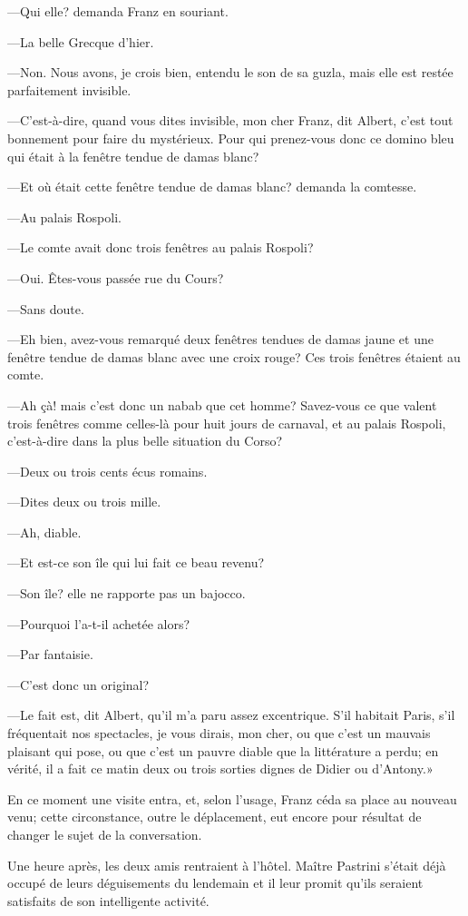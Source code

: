 —Qui elle? demanda Franz en souriant. 

—La belle Grecque d'hier. 

—Non. Nous avons, je crois bien, entendu le son de sa guzla, mais elle est restée parfaitement invisible.  

—C'est-à-dire, quand vous dites invisible, mon cher Franz, dit Albert, c'est tout bonnement pour faire du mystérieux. Pour qui prenez-vous donc ce domino bleu qui était à la fenêtre tendue de damas blanc? 

—Et où était cette fenêtre tendue de damas blanc? demanda la comtesse. 

—Au palais Rospoli. 

—Le comte avait donc trois fenêtres au palais Rospoli? 

—Oui. Êtes-vous passée rue du Cours? 

—Sans doute. 

—Eh bien, avez-vous remarqué deux fenêtres tendues de damas jaune et une fenêtre tendue de damas blanc avec une croix rouge? Ces trois fenêtres étaient au comte. 

—Ah çà! mais c'est donc un nabab que cet homme? Savez-vous ce que valent trois fenêtres comme celles-là pour huit jours de carnaval, et au palais Rospoli, c'est-à-dire dans la plus belle situation du Corso? 

—Deux ou trois cents écus romains. 

—Dites deux ou trois mille.  

—Ah, diable. 

—Et est-ce son île qui lui fait ce beau revenu? 

—Son île? elle ne rapporte pas un bajocco. 

—Pourquoi l'a-t-il achetée alors? 

—Par fantaisie. 

—C'est donc un original? 

—Le fait est, dit Albert, qu'il m'a paru assez excentrique. S'il habitait Paris, s'il fréquentait nos spectacles, je vous dirais, mon cher, ou que c'est un mauvais plaisant qui pose, ou que c'est un pauvre diable que la littérature a perdu; en vérité, il a fait ce matin deux ou trois sorties dignes de Didier ou d'Antony.» 

En ce moment une visite entra, et, selon l'usage, Franz céda sa place au nouveau venu; cette circonstance, outre le déplacement, eut encore pour résultat de changer le sujet de la conversation. 

Une heure après, les deux amis rentraient à l'hôtel. Maître Pastrini s'était déjà occupé de leurs déguisements du lendemain et il leur promit qu'ils seraient satisfaits de son intelligente activité. 

